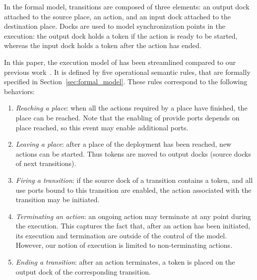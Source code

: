 %
In the formal model, transitions are composed of three elements: an
output dock attached to the source place, an action, and an input dock
attached to the destination place. Docks are used to model
synchronization points in the execution: the output dock holds a token
if the action is ready to be started, whereas the input dock holds a
token after the action has ended.

In this paper, the execution model of \mad has been streamlined
compared to our previous work~\cite{chardet:hal-01858150}. It is
defined by five operational semantic rules, that are formally
specified in Section~\ref{sec:formal_model}. These rules correspond to
the following behaviors:

\begin{enumerate}
\item \emph{Reaching a place}: when all the actions required by a place have finished, the place can be reached. Note that the enabling of provide ports depends on place reached, so this event may enable additional ports.
\item \emph{Leaving a place}: after a place of the deployment has been reached, new actions can be started. Thus tokens are moved to output docks (\ie source docks of next transitions).
\item \emph{Firing a transition}: if the source dock of a transition contains a token, and all use ports bound to this transition are enabled, the action associated with the transition may be initiated.
\item \emph{Terminating an action}: an ongoing action may terminate at any point during the execution. This captures the fact that, after an action has been initiated, its execution and termination are outside of the control of the \mad model. However, our notion of execution is limited to non-terminating actions.
\item \emph{Ending a transition}: after an action terminates, a token is placed on the output dock of the corresponding transition.
\end{enumerate}

